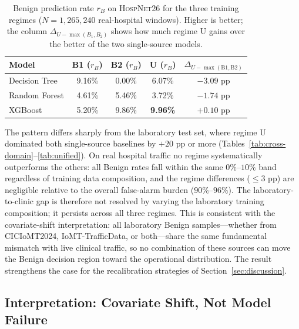 \documentclass[runningheads]{llncs}
\begin{document}
\begin{table}[H]
\centering
\caption{Benign prediction rate $r_{B}$ on \textsc{HospNet26} for the three training regimes ($N{=}1{,}265{,}240$ real-hospital windows). Higher is better; the column $\Delta_{U-\max(B_1,B_2)}$ shows how much regime U gains over the better of the two single-source models.}\label{tab:hospnet-regimes}
\small
\begin{tabular}{@{}lcccc@{}}
\toprule
\textbf{Model} & \textbf{B1 ($r_{B}$)} & \textbf{B2 ($r_{B}$)} & \textbf{U ($r_{B}$)} & \textbf{$\Delta_{U-\max(\text{B1},\text{B2})}$} \\
\midrule
Decision Tree & 9.16\%  & 0.00\%  & 6.07\%  & $-3.09$ pp \\
Random Forest & 4.61\%  & 5.46\%  & 3.72\%  & $-1.74$ pp \\
XGBoost       & 5.20\%  & 9.86\%  & \textbf{9.96\%} & $+0.10$ pp \\
\bottomrule
\end{tabular}
\end{table}

The pattern differs sharply from the laboratory test set, where regime U dominated both single-source baselines by $+20$ pp or more (Tables~\ref{tab:cross-domain}--\ref{tab:unified}). On real hospital traffic no regime systematically outperforms the others: all Benign rates fall within the same $0\%$--$10\%$ band regardless of training data composition, and the regime differences ($\leq 3$ pp) are negligible relative to the overall false-alarm burden ($90\%$--$96\%$). The laboratory-to-clinic gap is therefore not resolved by varying the laboratory training composition; it persists across all three regimes. This is consistent with the covariate-shift interpretation: all laboratory Benign samples---whether from CICIoMT2024, IoMT-TrafficData, or both---share the same fundamental mismatch with live clinical traffic, so no combination of these sources can move the Benign decision region toward the operational distribution. The result strengthens the case for the recalibration strategies of Section~\ref{sec:discussion}.

\subsection{Interpretation: Covariate Shift, Not Model Failure}
\end{document}
